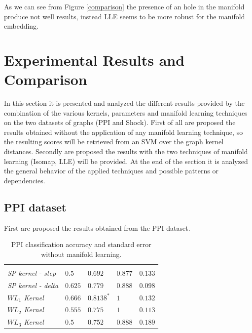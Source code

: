 \documentclass[11pt,a4paper]{article}
\begin{document}
As we can see from Figure \ref{comparison} the presence of an hole in the manifold produce not well results, instead LLE seems to be more robust for the manifold embedding.

\section{Experimental Results and Comparison}
In this section it is presented and analyzed the different results provided by the combination of the various kernels, parameters and manifold learning techniques on the two datasets of graphs (PPI and Shock). First of all are proposed the results obtained without the application of any manifold learning technique, so the resulting scores will be retrieved from an SVM over the graph kernel distances. Secondly are proposed the results with the two techniques of manifold learning (Isomap, LLE) will be provided. At the end of the section it is analyzed the general behavior of the applied techniques and possible patterns or dependencies.

\subsection{PPI dataset}
First are proposed the results obtained from the PPI dataset.

\renewcommand{\arraystretch}{1.5}
\begin{table}[H]
	\centering
	\begin{tabularx}{\linewidth}{|Y|l|l|l|l|}
		 &  &  &  & \\
		
		\centering \textit{SP kernel - step} & $0.5$ & $0.692$ & $0.877$ & $0.133$\\
		
		\centering \textit{SP kernel - delta} & $0.625$ & $0.779$ & $0.888$ & $0.098 $\\
		
		\centering \textit{$WL_1$ Kernel} &$0.666$ & $\mathbf{0.8138^*}$ & $1$ & $0.132$\\
		\centering \textit{$WL_2$ Kernel} &$0.555$ & $0.775$ & $1$ & $0.113$\\
		
		\centering \textit{$WL_3$ Kernel} &$0.5$ & $0.752$ & $0.888$ & $0.189$\\
	\end{tabularx}
		\caption{PPI classification accuracy and standard error without manifold learning.}
		\label{table:svmPPI}
\end{table}
\renewcommand{\arraystretch}{1}
\end{document}
